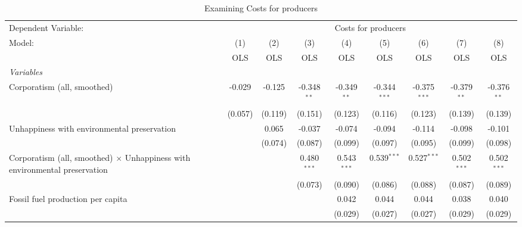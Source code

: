
\begin{table}[htbp]
   \caption{Examining Costs for producers}
   \centering
   \begin{tabular}{lcccccccc}
      \toprule
      Dependent Variable: & \multicolumn{8}{c}{Costs for producers}\\
      Model:                                                                            & (1)     & (2)     & (3)           & (4)           & (5)            & (6)            & (7)           & (8)\\  
                                                                                        &  OLS    & OLS     & OLS           & OLS           & OLS            & OLS            & OLS           & OLS\\  
      \midrule
      \emph{Variables}\\
      Corporatism (all, smoothed)                                                       & -0.029  & -0.125  & -0.348$^{**}$ & -0.349$^{**}$ & -0.344$^{***}$ & -0.375$^{***}$ & -0.379$^{**}$ & -0.376$^{**}$\\   
                                                                                        & (0.057) & (0.119) & (0.151)       & (0.123)       & (0.116)        & (0.123)        & (0.139)       & (0.139)\\   
      Unhappiness with environmental preservation                                       &         & 0.065   & -0.037        & -0.074        & -0.094         & -0.114         & -0.098        & -0.101\\   
                                                                                        &         & (0.074) & (0.087)       & (0.099)       & (0.097)        & (0.095)        & (0.099)       & (0.098)\\   
      Corporatism (all, smoothed) $\times$ Unhappiness with environmental preservation  &         &         & 0.480$^{***}$ & 0.543$^{***}$ & 0.539$^{***}$  & 0.527$^{***}$  & 0.502$^{***}$ & 0.502$^{***}$\\   
                                                                                        &         &         & (0.073)       & (0.090)       & (0.086)        & (0.088)        & (0.087)       & (0.089)\\   
      Fossil fuel production per capita                                                 &         &         &               & 0.042         & 0.044          & 0.044          & 0.038         & 0.040\\   
                                                                                        &         &         &               & (0.029)       & (0.027)        & (0.027)        & (0.029)       & (0.029)\\   

\end{tabular}
\end{table}
